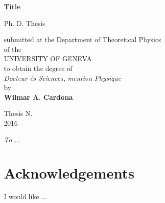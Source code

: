 \documentclass[12pt]{report}
\date{}
\renewcommand{\(}{\left(}
\renewcommand{\)}{\right)}
\renewcommand{\[}{\left[}
\renewcommand{\]}{\right]}
\begin{document}
\renewcommand{\figurename}{\textbf{Fig.}}
\renewcommand{\tablename}{\textbf{Tab.}}

\thispagestyle{empty}
\begin{center}  

\Large  \textbf{Title} \\
  
\vspace{4cm}  

\large Ph. D. Thesis

\vspace{4cm}

submitted at the Department of Theoretical Physics \\

of the \\

UNIVERSITY OF GENEVA\\

to obtain the degree of \\

\textit{Docteur ès Sciences, mention Physique}\\

by\\

\large \textbf{Wilmar A. Cardona}\\  

\vspace{4cm} 

\large Thesis N. \\  
\normalsize 2016  

\end{center}  

\newpage  
{}
  
  
\vspace{6cm}  
\begin{center}

\large \textit{To ...}
\normalsize

\end{center}
  
\newpage  

\chapter*{Acknowledgements} 

\vspace{3mm}

I would like ...
  
\newpage  
\end{document}
